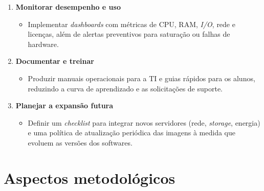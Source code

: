 \begin{enumerate}
    \item \textbf{Monitorar desempenho e uso}
    \begin{itemize}
        \item Implementar \textit{dashboards} com métricas de CPU, RAM, \textit{I/O}, rede e licenças, além de alertas preventivos para saturação ou falhas de hardware.
    \end{itemize}
    
    \item \textbf{Documentar e treinar}
    \begin{itemize}
        \item Produzir manuais operacionais para a TI e guias rápidos para os alunos, reduzindo a curva de aprendizado e as solicitações de suporte.
    \end{itemize}
    
    \item \textbf{Planejar a expansão futura}
    \begin{itemize}
        \item Definir um \textit{checklist} para integrar novos servidores (rede, \textit{storage}, energia) e uma política de atualização periódica das imagens à medida que evoluem as versões dos softwares.
    \end{itemize}
\end{enumerate}

\section{Aspectos metodológicos}

